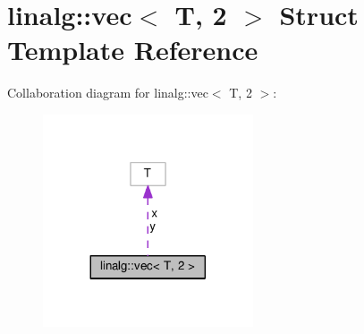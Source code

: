 \hypertarget{structlinalg_1_1vec_3_01T_00_012_01_4}{}\section{linalg\+:\+:vec$<$ T, 2 $>$ Struct Template Reference}
\label{structlinalg_1_1vec_3_01T_00_012_01_4}


Collaboration diagram for linalg\+:\+:vec$<$ T, 2 $>$\+:
\nopagebreak
\begin{figure}[H]
\begin{center}
\leavevmode
\includegraphics[width=176pt]{structlinalg_1_1vec_3_01T_00_012_01_4__coll__graph}
\end{center}
\end{figure}

